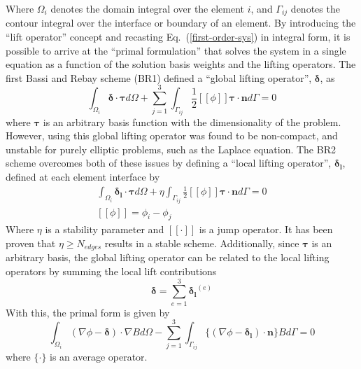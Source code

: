 \documentclass[a4paper]{report}
\newcommand{\eref}[1]{Eq.~(\ref{#1})}
\newcommand{\dint}[1]{\int_{\Omega_i}{#1 d\Omega}}
\newcommand{\sint}[1]{\int_{\Gamma_{ij}}{#1 d\Gamma}}
\newcommand{\average}[1]{\ensuremath{\{#1\}} }
\newcommand{\jump}[1]{\ensuremath{[\![#1]\!]} }
\newcommand{\vbasis}{\boldsymbol{\tau}}
\newcommand{\glift}{\boldsymbol{\delta}}
\newcommand{\llift}{\boldsymbol{\delta_l}}
\newcommand{\unitn}{\mathbf{n}}
\begin{document}
Where $\Omega_i$ denotes the domain integral over the element $i$, and
$\Gamma_{ij}$ denotes the contour integral over the interface or boundary of an
element.
By introducing the ``lift operator'' concept and recasting
\eref{first-order-sys} in integral form, it is possible to arrive at the
``primal formulation'' that solves the system in a single equation as a function
of the solution basis weights and the lifting operators.  The first Bassi and
Rebay scheme (BR1) defined a ``global lifting operator'', $\glift$, as
\begin{equation}
  \dint{\glift \cdot \vbasis} + \sum_{j=1}^3\sint{\frac{1}{2} \jump{\phi}
  \vbasis \cdot \unitn} = 0
  \label{global-lift-def}
\end{equation}
where $\vbasis$ is an arbitrary basis function with the dimensionality of the
problem. However, using this global lifting operator was found to be
non-compact, and unstable for purely elliptic problems, such as the Laplace
equation. The BR2 scheme overcomes both of these issues by defining a ``local
lifting operator'', $\llift$, defined at each element interface by
\begin{equation}
  \begin{gathered}
    \dint{\llift \cdot \vbasis} + \eta\sint{\frac{1}{2} \jump{\phi} \vbasis
    \cdot \unitn} = 0 \\
    \jump{\phi} = \phi_i - \phi_j
  \end{gathered}
  \label{local-lift-def}
\end{equation}
Where $\eta$ is a stability parameter and $\jump{\cdot}$ is a jump operator.  It
has been proven that $\eta \geq N_{edges}$ results in a stable scheme.
Additionally, since $\vbasis$ is an arbitrary basis, the global lifting operator
can be related to the local lifting operators by summing the local lift
contributions
\begin{equation}
  \glift = \sum_{e=1}^3{\llift^{(e)}}
  \label{local-global-relation}
\end{equation}
With this, the primal form is given by
\begin{equation}
  \dint{(\nabla \phi - \glift)\cdot \nabla B} -
  \sum_{j=1}^3\sint{\average{(\nabla \phi - \llift)\cdot\unitn}B} = 0
  \label{primal-form}
\end{equation}
where $\average{\cdot}$ is an average operator.
\end{document}
